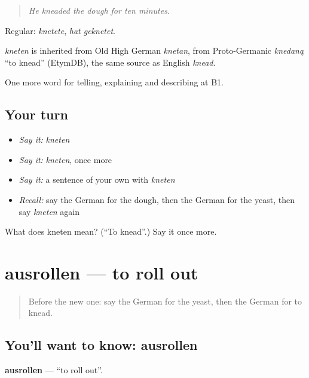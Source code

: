 \begin{quote}
\emph{He kneaded the dough for ten minutes.}
\end{quote}

Regular: \emph{knetete}, \emph{hat geknetet}.

\begin{cousinweb}
\emph{kneten} is inherited from Old High German \emph{knetan}, from Proto-Germanic \emph{knedaną} \textquotedblleft{}to knead\textquotedblright{} (EtymDB), the same source as English \emph{knead}.
\end{cousinweb}

\begin{grammarlens}[title={What you've built}]
One more word for telling, explaining and describing at B1.
\end{grammarlens}

\subsection*{Your turn}
\begin{itemize}
\raggedright
  \item \emph{Say it:} \emph{kneten}
  \item \emph{Say it:} \emph{kneten}, once more
  \item \emph{Say it:} a sentence of your own with \emph{kneten}
  \item \emph{Recall:} say the German for the dough, then the German for the yeast, then say \emph{kneten} again
\end{itemize}

\begin{tcolorbox}[breakable,colback=teal!4,colframe=teal!35!black,title={Before you move on}]
What does kneten mean? (\textquotedblleft{}To knead\textquotedblright{}.) Say it once more.
\end{tcolorbox}
\section[ausrollen]{ausrollen — to roll out}

\label{lesson:GE-C325-ausrollen}



\begin{quote}
Before the new one: say the German for the yeast, then the German for to knead.
\end{quote}

\subsection*{You'll want to know: ausrollen}
\textbf{ausrollen} — \textquotedblleft{}to roll out\textquotedblright{}.

